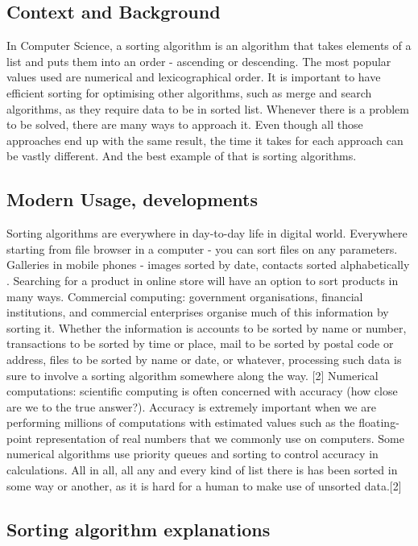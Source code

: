 \documentclass[]{report}
\begin{document}
\subsection{Context and Background}
	In Computer Science, a sorting algorithm is an algorithm that takes elements of a list and puts them into an order - ascending or descending. The most popular values used are numerical and lexicographical order. It is important to have efficient sorting for optimising other algorithms, such as merge and search algorithms, as they require data to be in sorted list.
	Whenever there is a problem to be solved, there are many ways to approach it. Even though all those approaches end up with the same result, the time it takes for each approach can be vastly different. And the best example of that is sorting algorithms.  
		\subsection{Modern Usage, developments}
		
		Sorting algorithms are everywhere in day-to-day life in digital world. Everywhere starting from file browser in a computer - you can sort files on any parameters. Galleries in mobile phones - images sorted by date, contacts sorted alphabetically . Searching for a product in online store will have an option to sort products in many ways. 
		Commercial computing: government organisations, financial institutions, and commercial enterprises organise much of this information by sorting it. Whether the information is accounts to be sorted by name or number, transactions to be sorted by time or place, mail to be sorted by postal code or address, files to be sorted by name or date, or whatever, processing such data is sure to involve a sorting algorithm somewhere along the way. [2]
		Numerical computations: scientific computing is often concerned with accuracy (how close are we to the true answer?). Accuracy is extremely important when we are performing millions of computations with estimated values such as the floating-point representation of real numbers that we commonly use on computers. Some numerical algorithms use priority queues and sorting to control accuracy in calculations. All in all, all any and every kind of list there is has been sorted in some way or another, as it is hard for a human to make use of unsorted data.[2]
		
\subsection{Sorting algorithm explanations}
\end{document}

